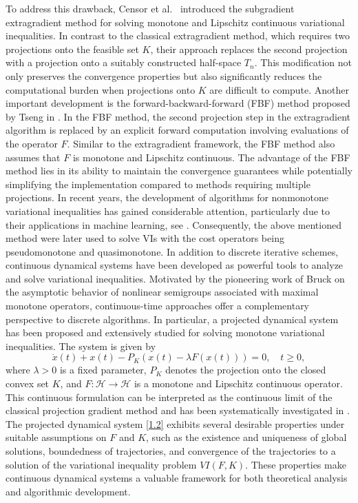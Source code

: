 \documentclass[hidelinks,11 pt]{article}
\numberwithin{equation}{section}
\theoremstyle{definition}  %
\numberwithin{equation}{section}
\numberwithin{theorem}{section}
\begin{document}
To address this drawback, Censor et al.\ \cite{a12} introduced the subgradient extragradient method for solving monotone and Lipschitz continuous variational inequalities. In contrast to the classical extragradient method, which requires two projections onto the feasible set \( K \), their approach replaces the second projection with a projection onto a suitably constructed half-space \( T_n \). This modification not only preserves the convergence properties but also significantly reduces the computational burden when projections onto \( K \) are difficult to compute. Another important development is the forward-backward-forward (FBF) method proposed by Tseng in \cite{a13}. In the FBF method, the second projection step in the extragradient algorithm is replaced by an explicit forward computation involving evaluations of the operator \( F \). Similar to the extragradient framework, the FBF method also assumes that \( F \) is monotone and Lipschitz continuous. The advantage of the FBF method lies in its ability to maintain the convergence guarantees while potentially simplifying the implementation compared to methods requiring multiple projections.
In recent years, the development of algorithms for nonmonotone variational inequalities has gained considerable attention, particularly due to their applications in machine learning, see \cite{a14,a15,a16,a17,a31,a32}. Consequently, the above mentioned method  were later used to solve VIs with the cost operators being pseudomonotone and quasimonotone. 
\vskip 2mm 
In addition to discrete iterative schemes, continuous dynamical systems have been developed as powerful tools to analyze and solve variational inequalities. Motivated by the pioneering work of Bruck \cite{Bruck1975} on the asymptotic behavior of nonlinear semigroups associated with maximal monotone operators, continuous-time approaches offer a complementary perspective to discrete algorithms.
\vskip 2mm 
In particular, a projected dynamical system has been proposed and extensively studied for solving monotone variational inequalities. The system is given by
\begin{equation}\label{1.2}
    \dot{x}(t) + x(t) - P_K\left(x(t) - \lambda F(x(t))\right) = 0, \quad t \geq 0,
\end{equation}
where \( \lambda > 0 \) is a fixed parameter, \( P_K \) denotes the projection onto the closed convex set \( K \), and \( F: \mathcal{H} \to \mathcal{H}\) is a monotone and Lipschitz continuous operator. This continuous formulation can be interpreted as the continuous limit of the classical projection gradient method and has been systematically investigated in \cite{Alvarez2000, AttouchCzarnecki2011}. The projected dynamical system \eqref{1.2} exhibits several desirable properties under suitable assumptions on \( F \) and \( K \), such as the existence and uniqueness of global solutions, boundedness of trajectories, and convergence of the trajectories to a solution of the variational inequality problem \( VI(F, K) \). These properties make continuous dynamical systems a valuable framework for both theoretical analysis and algorithmic development.
\end{document}
